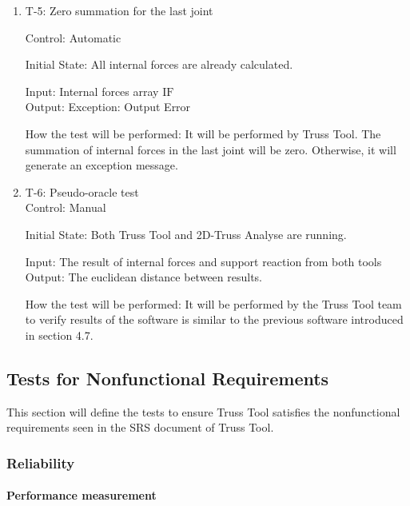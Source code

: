 \documentclass[12pt, titlepage]{article}
\begin{document}
\begin{enumerate}

\item{T-5: Zero summation for the last joint\\}

Control: Automatic
					
Initial State: All internal forces are already calculated.
					
Input: Internal forces array $\mbox {IF}$\\
					
Output: Exception: Output Error
					
How the test will be performed: It will be performed by Truss Tool. The summation of internal forces in the last joint will be zero. Otherwise, it will generate an exception message.
\item{T-6: Pseudo-oracle test\\}
Control: Manual
					
Initial State: Both Truss Tool and 2D-Truss Analyse are running.
					
Input: The result of internal forces and support reaction from both tools \\
					
Output:  The euclidean distance between results.
					
How the test will be performed: It will be performed by the Truss Tool team to verify results of the software is similar to the previous software introduced in section 4.7.

\end{enumerate}

\subsection{Tests for Nonfunctional Requirements}
This section will define the tests to ensure Truss Tool satisfies the nonfunctional requirements seen in the SRS document of Truss Tool. 
\subsubsection{Reliability}


		
\paragraph{Performance measurement}
\end{document}
